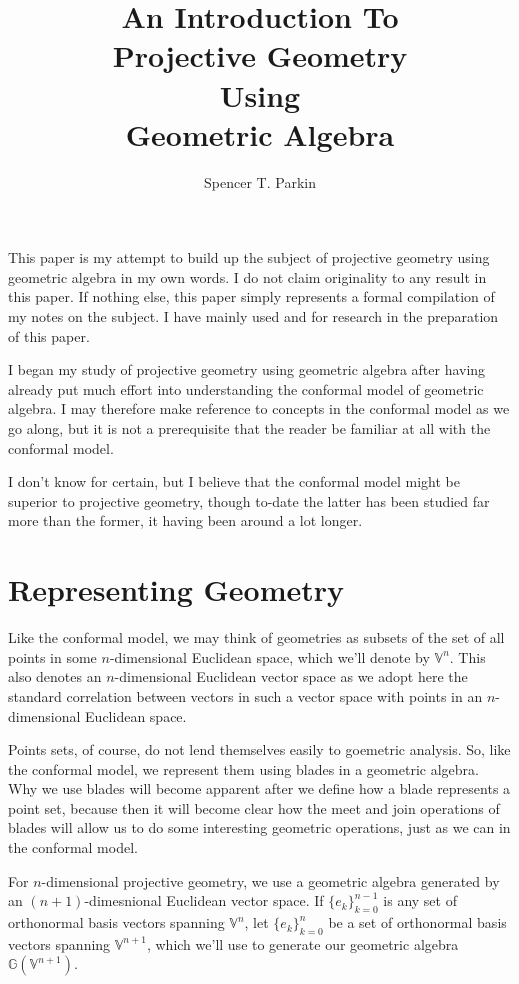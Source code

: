 \documentclass[12pt]{article}
\title{An Introduction To\\Projective Geometry\\Using\\Geometric Algebra}
\author{Spencer T. Parkin}
\newcommand{\G}{\mathbb{G}}
\newcommand{\V}{\mathbb{V}}
\begin{document}
\maketitle

This paper is my attempt to build up the subject of projective
geometry using geometric algebra in my own words.  I do not
claim originality to any result in this paper.  If nothing else, this
paper simply represents a formal compilation of my notes on the
subject.  I have mainly used \cite{hestenes91} and \cite{dorst07}
for research in the preparation of this paper.

I began my study of projective geometry using geometric algebra
after having already put much effort into understanding the
conformal model of geometric algebra.  I may therefore make reference
to concepts in the conformal model as we go along, but it is not a
prerequisite that the reader be familiar at all with the conformal model.

I don't know for certain, but I believe that the conformal model
might be superior to projective geometry, though to-date the latter has
been studied far more than the former, it having been around a lot longer.

\section{Representing Geometry}

Like the conformal model, we may think of geometries as subsets of the
set of all points in some $n$-dimensional Euclidean space, which we'll
denote by $\V^n$.  This also denotes an $n$-dimensional Euclidean vector space
as we adopt here the standard correlation between vectors in such a vector space
with points in an $n$-dimensional Euclidean space.

Points sets, of course, do not lend themselves easily to goemetric analysis.  So,
like the conformal model, we represent them using blades in a geometric algebra.
Why we use blades will become apparent after we define how a blade represents
a point set, because then it will become clear how the meet and join operations
of blades will allow us to do some interesting geometric operations, just as we
can in the conformal model.

For $n$-dimensional projective geometry, we use a geometric algebra generated
by an $(n+1)$-dimesnional Euclidean vector space.  If $\{e_k\}_{k=0}^{n-1}$ is any set of orthonormal basis
vectors spanning $\V^n$, let $\{e_k\}_{k=0}^n$ be a set of
orthonormal basis vectors spanning $\V^{n+1}$, which we'll use to generate our
geometric algebra $\G(\V^{n+1})$.
\end{document}
